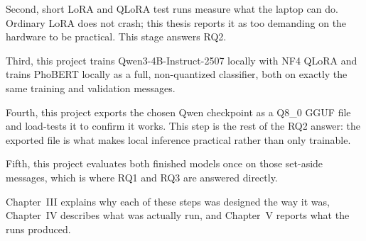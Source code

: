 Second, short LoRA and QLoRA test runs measure what the laptop can do. Ordinary LoRA does not crash; this thesis reports it as too demanding on the hardware to be practical. This stage answers RQ2.

Third, this project trains Qwen3-4B-Instruct-2507 locally with NF4 QLoRA and trains PhoBERT locally as a full, non-quantized classifier, both on exactly the same training and validation messages.

Fourth, this project exports the chosen Qwen checkpoint as a Q8\_0 GGUF file and load-tests it to confirm it works. This step is the rest of the RQ2 answer: the exported file is what makes local inference practical rather than only trainable.

Fifth, this project evaluates both finished models once on those set-aside messages, which is where RQ1 and RQ3 are answered directly.

Chapter~III explains why each of these steps was designed the way it was, Chapter~IV describes what was actually run, and Chapter~V reports what the runs produced.
